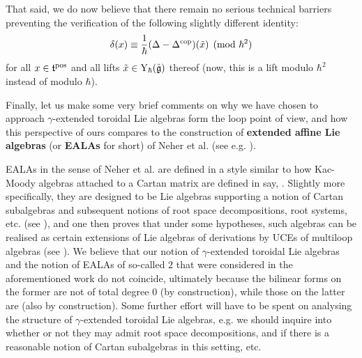         That said, we do now believe that there remain no serious technical barriers preventing the verification of the following slightly different identity:
            $$\delta(x) \equiv \frac{1}{\hbar}(\Delta - \Delta^{\mathrm{cop}})(\tilde{x}) \pmod{\hbar^2}$$
        for all $x \in \mathfrak{t}^{\mathrm{pos}}$ and all lifts $\tilde{x} \in \mathrm{Y}_{\hbar}(\hat{\mathfrak{g}})$ thereof (now, this is a lift modulo $\hbar^2$ instead of modulo $\hbar$). 

        Finally, let us make some very brief comments on why we have chosen to approach $\gamma$-extended toroidal Lie algebras form the loop point of view, and how this perspective of ours compares to the construction of \textbf{extended affine Lie algebras} (or \textbf{EALAs} for short) of Neher et al. (see e.g. \cite{neher_lectures_on_EALAs}).

        EALAs in the sense of Neher et al. are defined in a style similar to how Kac-Moody algebras attached to a Cartan matrix are defined in say, \cite[Chapters 1 and 2]{kac_infinite_dimensional_lie_algebras}. Slightly more specifically, they are designed to be Lie algebras supporting a notion of Cartan subalgebras and subsequent notions of root space decompositions, root systems, etc. (see \cite[Subsection 2.1]{neher_lectures_on_EALAs}), and one then proves that under some hypotheses, such algebras can be realised as certain extensions of Lie algebras of derivations by UCEs of multiloop algebras (see \cite{allison_berman_faulkner_pianzola_multiloop_realisation_of_EALAs}). We believe that our notion of $\gamma$-extended toroidal Lie algebras and the notion of EALAs of so-called  $2$ that were considered in the aforementioned work do not coincide, ultimately because the bilinear forms on the former are not of total degree $0$ (by construction), while those on the latter are (also by construction). Some further effort will have to be spent on analysing the structure of $\gamma$-extended toroidal Lie algebras, e.g. we should inquire into whether or not they may admit root space decompositions, and if there is a reasonable notion of Cartan subalgebras in this setting, etc.
        
